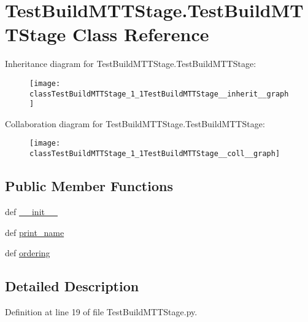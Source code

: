 \hypertarget{classTestBuildMTTStage_1_1TestBuildMTTStage}{\section{Test\-Build\-M\-T\-T\-Stage.\-Test\-Build\-M\-T\-T\-Stage Class Reference}
\label{classTestBuildMTTStage_1_1TestBuildMTTStage}
}


Inheritance diagram for Test\-Build\-M\-T\-T\-Stage.\-Test\-Build\-M\-T\-T\-Stage\-:\nopagebreak
\begin{figure}[H]
\begin{center}
\leavevmode
\texttt{[image: classTestBuildMTTStage\_1\_1TestBuildMTTStage\_\_inherit\_\_graph]}
\end{center}
\end{figure}


Collaboration diagram for Test\-Build\-M\-T\-T\-Stage.\-Test\-Build\-M\-T\-T\-Stage\-:\nopagebreak
\begin{figure}[H]
\begin{center}
\leavevmode
\texttt{[image: classTestBuildMTTStage\_1\_1TestBuildMTTStage\_\_coll\_\_graph]}
\end{center}
\end{figure}
\subsection*{Public Member Functions}
\begin{DoxyCompactItemize}
\item 
def \hyperlink{classTestBuildMTTStage_1_1TestBuildMTTStage_a7279f91570391f284d528437036c2e8b}{\-\_\-\-\_\-init\-\_\-\-\_\-}
\item 
def \hyperlink{classTestBuildMTTStage_1_1TestBuildMTTStage_a7f49f51eb8e6882dd05a2b9118128845}{print\-\_\-name}
\item 
def \hyperlink{classTestBuildMTTStage_1_1TestBuildMTTStage_a3d51dc0117e9f06576dc52882aecdc83}{ordering}
\end{DoxyCompactItemize}


\subsection{Detailed Description}


Definition at line 19 of file Test\-Build\-M\-T\-T\-Stage.\-py.



